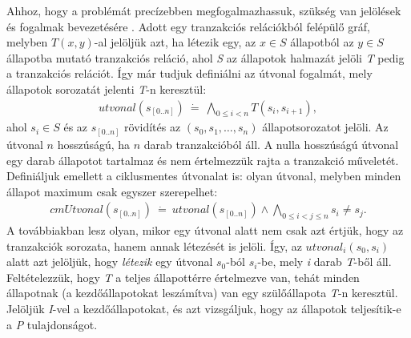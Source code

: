 Ahhoz, hogy a problémát precízebben megfogalmazhassuk, szükség van jelölések és fogalmak bevezetésére \cite{k_induction_article}. Adott egy tranzakciós relációkból felépülő gráf, melyben $T(x, y)$-al jelöljük azt, ha létezik egy, az $x \in S$ állapotból az $y \in S$ állapotba mutató tranzakciós reláció, ahol \emph{S} az állapotok halmazát jelöli \textit{T} pedig a tranzakciós relációt. Így már tudjuk definiálni az útvonal fogalmát, mely állapotok sorozatát jelenti \emph{T}-n keresztül:
\begin{align}
	\label{eq:relacio_sor}
	\mathit{utvonal}(s_{[0..n]})~\dot{=}~\bigwedge_{0 \leq i < n} T(s_{i}, s_{i+1}),
\end{align}
ahol $s_i \in S$ és az $s_{[0..n]}$ rövidítés az $(s_{0}, s_{1}, \dots, s_{n})$ állapotsorozatot jelöli. Az útvonal $n$ hosszúságú, ha $n$ darab tranzakcióból áll. A nulla hosszúságú útvonal egy darab állapotot tartalmaz és nem értelmezzük rajta a tranzakció műveletét.
\newline
\newline
Definiáljuk emellett a ciklusmentes útvonalat is: olyan útvonal, melyben minden állapot maximum csak egyszer szerepelhet:
\begin{align}
	\mathit{cmUtvonal}(s_{[0..n]})~\dot{=}~\mathit{utvonal}(s_{[0..n]}) \wedge \bigwedge_{0 \leq i < j \leq n} s_{i} \neq s_{j}.
\end{align}
A továbbiakban lesz olyan, mikor egy útvonal alatt nem csak azt értjük, hogy az tranzakciók sorozata, hanem annak létezését is jelöli. Így, az $\mathit{utvonal}_{i}(s_{0}, s_{i})$ alatt azt jelöljük, hogy \emph{létezik} egy útvonal $s_{0}$-ból $s_{i}$-be, mely \emph{i} darab \emph{T}-ből áll.
\newline
\newline
Feltételezzük, hogy \emph{T} a teljes állapottérre értelmezve van, tehát minden állapotnak (a kezdőállapotokat leszámítva) van egy szülőállapota \emph{T}-n keresztül. Jelöljük \emph{I}-vel a kezdőállapotokat, és azt vizsgáljuk, hogy az állapotok teljesítik-e a \emph{P} tulajdonságot.

